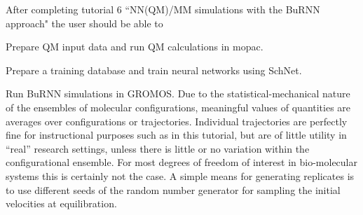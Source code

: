 %
After completing tutorial 6 “NN(QM)/MM simulations with the
BuRNN approach" the user should be able to
\item Prepare QM input data and run QM calculations in
mopac.
\item Prepare a training database and train neural networks
using SchNet.
\item Run BuRNN simulations in GROMOS.
%
Due to the statistical-mechanical nature of the ensembles of molecular configurations, meaningful values of quantities are averages over configurations or trajectories. Individual trajectories are perfectly fine for instructional purposes such as in this tutorial, but are of little utility in ``real'' research settings, unless there is little or no variation within the configurational ensemble. 
For most degrees of freedom of interest in bio-molecular systems this is certainly not the case. A simple means for generating replicates is to use different seeds of the random number generator for sampling the initial velocities at equilibration.



